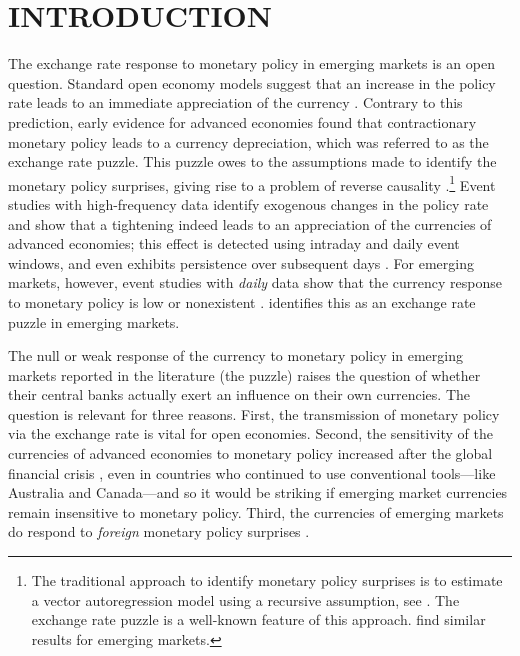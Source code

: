 \documentclass[a4paper,12pt]{article} 		%
\begin{document}

\section{INTRODUCTION}
\sectitlespace

The exchange rate response to monetary policy in emerging markets is an open question. Standard open economy models suggest that an increase in the policy rate leads to an immediate appreciation of the currency \parencite{Dornbusch:1976}. Contrary to this prediction, early evidence for advanced economies \parencite{GrilliRoubini:1995} found that contractionary monetary policy leads to a currency depreciation, which was referred to as the exchange rate puzzle. This puzzle owes to the assumptions made to identify the monetary policy surprises, giving rise to a problem of reverse causality \parencite{Zettelmeyer:2004}.\footnote{The traditional approach to identify monetary policy surprises is to estimate a vector autoregression model using a recursive assumption, see \textcite{CEE:1999}. The exchange rate puzzle is a well-known feature of this approach. \textcite{KimLim:2016} find similar results for emerging markets.} Event studies with high-frequency data identify exogenous changes in the policy rate and show that a tightening indeed leads to an appreciation of the currencies of advanced economies; this effect is detected using intraday \parencite{ABDV:2003,KearnsManners:2006,FRWW:2007} and daily \parencite{Wright:2012, FerrariKearnsSchrimpf:2021} event windows, and even exhibits persistence over subsequent days \parencite{Rosa:2011JBF, FerrariKearnsSchrimpf:2021}. For emerging markets, however, event studies with \textit{daily} data show that the currency response to monetary policy is low or nonexistent \parencite{Aktasetal:2009, Duranetal:2012,PenningsRamayandiTang:2015}. \textcite{Kohlscheen:2014} identifies this as an exchange rate puzzle in emerging markets. 

The null or weak response of the currency to monetary policy in emerging markets reported in the literature (the puzzle) raises the question of whether their central banks actually exert an influence on their own currencies. The question is relevant for three reasons. First, the transmission of monetary policy via the exchange rate is vital for open economies. Second, the sensitivity of the currencies of advanced economies to monetary policy increased after the global financial crisis \parencite{FerrariKearnsSchrimpf:2021}, even in countries who continued to use conventional tools---like Australia and Canada---and so it would be striking if emerging market currencies remain insensitive to monetary policy. Third, the currencies of emerging markets do respond to \textit{foreign} monetary policy surprises \parencite{HausmanWongswan:2011,KearnsSchrimpfXia:2018}.
\end{document}
